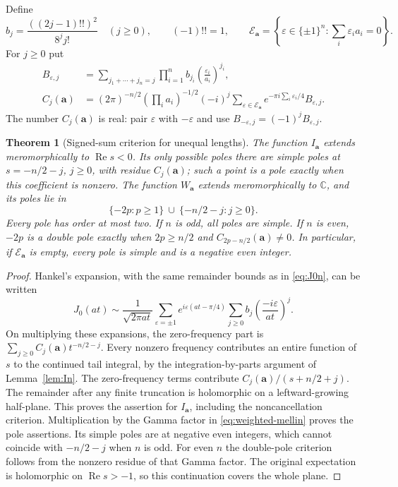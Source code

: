 \documentclass[11pt]{amsart}
\newtheorem{thm}{Theorem}[section]
\theoremstyle{definition}
\newcommand{\C}{\mathbb C}
\begin{document}
Define
\[
 b_j=\frac{((2j-1)!!)^2}{8^j j!}\quad(j\ge0),\qquad (-1)!!=1,
 \qquad \mathcal E_{\boldsymbol a}
 =\left\{\varepsilon\in\{\pm1\}^n:
            \sum_i\varepsilon_i a_i=0\right\}.
\]
For $j\ge0$ put
\begin{align}
 B_{\varepsilon,j}
 &=\sum_{j_1+\cdots+j_n=j}\prod_{i=1}^n
        b_{j_i}\left(\frac{\varepsilon_i}{a_i}\right)^{j_i},\label{eq:weighted-B}\\
 C_j(\boldsymbol a)
 &=(2\pi)^{-n/2}\left(\prod_i a_i\right)^{-1/2}
   (-i)^j\sum_{\varepsilon\in\mathcal E_{\boldsymbol a}}
       e^{-\pi i\sum_i\varepsilon_i/4}B_{\varepsilon,j}.
       \label{eq:weighted-C}
\end{align}
The number $C_j(\boldsymbol a)$ is real: pair $\varepsilon$ with
$-\varepsilon$ and use $B_{-\varepsilon,j}=(-1)^jB_{\varepsilon,j}$.

\begin{thm}[Signed-sum criterion for unequal lengths]
\label{thm:weighted-resonance}
The function $I_{\boldsymbol a}$ extends meromorphically to
$\operatorname{Re}s<0$. Its only possible poles there are simple poles
at $s=-n/2-j$, $j\ge0$, with residue $C_j(\boldsymbol a)$; such a point
is a pole exactly when this coefficient is nonzero.
The function $W_{\boldsymbol a}$ extends meromorphically to $\C$, and
its poles lie in
\[
 \{-2p:p\ge1\}\ \cup\ \{-n/2-j:j\ge0\}.
\]
Every pole has order at most two. If $n$ is odd, all poles are simple.
If $n$ is even, $-2p$ is a double pole exactly when
$2p\ge n/2$ and $C_{2p-n/2}(\boldsymbol a)\ne0$.
In particular, if $\mathcal E_{\boldsymbol a}$ is empty, every pole is
simple and is a negative even integer.
\end{thm}
\begin{proof}
Hankel's expansion, with the same remainder bounds as in
\eqref{eq:J0n}, can be written
\[
 J_0(at)\sim\frac1{\sqrt{2\pi at}}
 \sum_{\varepsilon=\pm1}e^{i\varepsilon(at-\pi/4)}
 \sum_{j\ge0}b_j\left(\frac{-i\varepsilon}{at}\right)^j.
\]
On multiplying these expansions, the zero-frequency part is
$\sum_{j\ge0}C_j(\boldsymbol a)t^{-n/2-j}$.
Every nonzero frequency contributes an entire function of $s$ to the
continued tail integral, by the integration-by-parts argument of
Lemma~\ref{lem:In}. The zero-frequency terms contribute
$C_j(\boldsymbol a)/(s+n/2+j)$. The remainder after any finite truncation
is holomorphic on a leftward-growing half-plane. This proves the
assertion for $I_{\boldsymbol a}$, including the noncancellation criterion.
Multiplication by the Gamma factor in \eqref{eq:weighted-mellin} proves
the pole assertions. Its simple poles are at negative even integers,
which cannot coincide with $-n/2-j$ when $n$ is odd. For even $n$ the
double-pole criterion follows from the nonzero residue of that Gamma
factor. The original expectation is holomorphic on
$\operatorname{Re}s>-1$, so this continuation covers the whole plane.
\end{proof}
\end{document}
